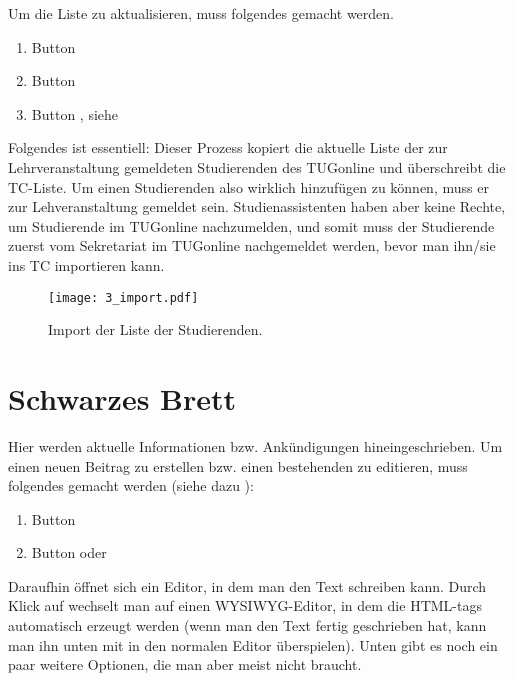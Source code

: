 Um die Liste zu aktualisieren, muss folgendes gemacht werden.
\begin{enumerate}
\item Button 
\item Button 
\item Button , siehe 
\end{enumerate}

Folgendes ist essentiell: Dieser Prozess kopiert die aktuelle Liste der zur
Lehrveranstaltung gemeldeten Studierenden des TUGonline und überschreibt die
TC-Liste. Um einen Studierenden also wirklich hinzufügen zu können, muss er zur
Lehveranstaltung gemeldet sein. Studienassistenten haben aber keine Rechte, um
Studierende im TUGonline nachzumelden, und somit muss der Studierende zuerst
vom Sekretariat im TUGonline  nachgemeldet werden, bevor man ihn/sie ins TC
importieren kann.

\begin{figure}[htbp]
  \texttt{[image: 3\_import.pdf]}
  \caption{ Import der Liste der Studierenden.}
  \label{fig:import}
\end{figure}

\section{Schwarzes Brett}

Hier werden aktuelle Informationen bzw. Ankündigungen hineingeschrieben. Um
einen neuen Beitrag zu erstellen bzw. einen bestehenden zu editieren, muss
folgendes gemacht werden (siehe dazu ):
\begin{enumerate}
\item Button 
\item Button  oder 
\end{enumerate}

Daraufhin öffnet sich ein Editor, in dem man den Text schreiben kann. Durch
Klick auf  wechselt man auf einen WYSIWYG\footnotemark[1]
-Editor, in dem die HTML-tags automatisch erzeugt werden (wenn man den Text
fertig geschrieben hat, kann man ihn unten mit  in den
normalen Editor überspielen). Unten gibt es noch ein paar weitere Optionen,
die man aber meist nicht braucht.


